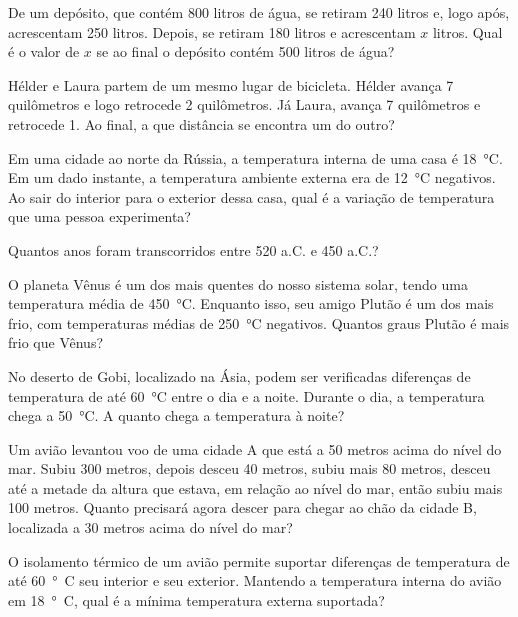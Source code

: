 \begin{questions}
\question De um depósito, que contém 800 litros de água, se retiram 240 litros e, logo após, acrescentam 250 litros. Depois, se retiram 180 litros e acrescentam $x$ litros. Qual é o valor de $x$ se ao final o depósito contém 500 litros de água?

\question Hélder e Laura partem de um mesmo lugar de bicicleta. Hélder avança 7 quilômetros e logo retrocede 2 quilômetros. Já Laura, avança 7 quilômetros e retrocede 1. Ao final, a que distância se encontra um do outro?

\question Em uma cidade ao norte da Rússia, a temperatura interna de uma casa é \SI{18}{\celsius}. Em um dado instante, a temperatura ambiente externa era de \SI{12}{\celsius} negativos. Ao sair do interior para o exterior dessa casa, qual é a variação de temperatura que uma pessoa experimenta?

\question Quantos anos foram transcorridos entre 520 a.C. e 450 a.C.?

\question O planeta Vênus é um dos mais quentes do nosso sistema solar, tendo uma temperatura média de \SI{450}{\celsius}. Enquanto isso, seu amigo Plutão é um dos mais frio, com temperaturas médias de \SI{250}{\celsius} negativos. Quantos graus Plutão é mais frio que Vênus?


\question No deserto de Gobi, localizado na Ásia, podem ser verificadas diferenças de temperatura de até \SI{60}{\celsius} entre o dia e a noite. Durante o dia, a temperatura chega a \SI{50}{\celsius}. A quanto chega a temperatura à noite?


\question Um avião levantou voo de uma cidade A que está a 50 metros acima do nível do mar. Subiu 300 metros, depois desceu 40 metros, subiu mais 80 metros, desceu até a metade da altura que estava, em relação ao nível do mar, então subiu mais 100 metros. Quanto precisará agora descer para chegar ao chão da cidade B, localizada a 30 metros acima do nível do mar?

\question O isolamento térmico de um avião permite suportar diferenças de temperatura de até \SI{60}{\degree C} seu interior e seu exterior. Mantendo a temperatura interna do avião em \SI{18}{\degree C}, qual é a mínima temperatura externa suportada?


\end{questions}
